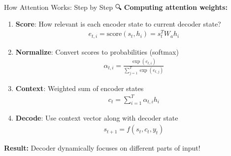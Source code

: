 \documentclass[aspectratio=169]{beamer}
\begin{document}
\begin{frame}{How Attention Works: Step by Step 🔍}
\textbf{Computing attention weights:}

\vspace{1em}

\begin{enumerate}\setlength{\itemsep}{0pt}
    \item \textbf{Score}: How relevant is each encoder state to current decoder state?
    \begin{align*}
    e_{t,i} = \text{score}(s_t, h_i) = s_t^T W_a h_i
    \end{align*}

    \item \textbf{Normalize}: Convert scores to probabilities (softmax)
    \begin{align*}
    \alpha_{t,i} = \frac{\exp(e_{t,i})}{\sum_{j=1}^{T} \exp(e_{t,j})}
    \end{align*}

    \item \textbf{Context}: Weighted sum of encoder states
    \begin{align*}
    c_t = \sum_{i=1}^{T} \alpha_{t,i} h_i
    \end{align*}

    \item \textbf{Decode}: Use context vector along with decoder state
    \begin{align*}
    s_{t+1} = f(s_t, c_t, y_t)
    \end{align*}
\end{enumerate}

\vspace{0.5em}

\textbf{Result:} Decoder dynamically focuses on different parts of input!
\end{frame}
\end{document}
